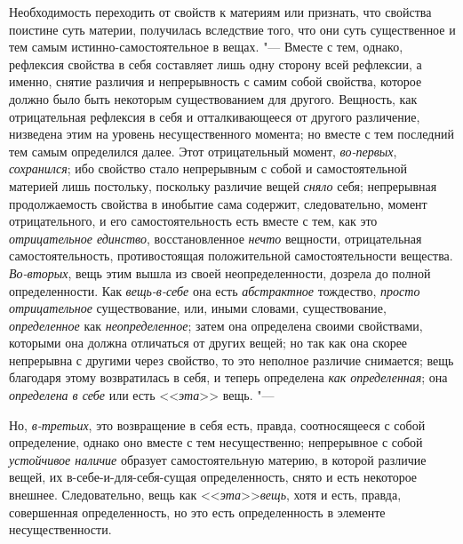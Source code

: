 Необходимость переходить от свойств к материям или признать, что свойства
поистине суть материи, получилась вследствие того, что они суть
существенное и тем самым истинно-самостоятельное в вещах. "--- Вместе с тем,
однако, рефлексия свойства в себя составляет лишь одну сторону всей
рефлексии, а именно, снятие различия и непрерывность с самим собой
свойства, которое должно было быть некоторым существованием для другого.
Вещность, как отрицательная рефлексия в себя и отталкивающееся от другого
различение, низведена этим на уровень несущественного момента; но вместе с
тем последний тем самым определился далее. Этот отрицательный момент,
{\em во-первых}, {\em сохранился};
ибо свойство стало непрерывным с собой и самостоятельной материей лишь
постольку, поскольку различие вещей {\em сняло} себя;
непрерывная продолжаемость свойства в инобытие сама содержит,
следовательно, момент отрицательного, и его самостоятельность есть вместе с
тем, как это {\em отрицательное единство},
восстановленное {\em нечто} вещности, отрицательная
самостоятельность, противостоящая положительной самостоятельности вещества.
{\em Во-вторых}, вещь этим вышла из своей
неопределенности, дозрела до полной определенности. Как
{\em вещь-в-себе} она есть
{\em абстрактное} тождество,
{\em просто отрицательное} существование, или, иными
словами, существование, {\em определенное} как
{\em неопределенное}; затем она определена своими
свойствами, которыми она должна отличаться от других вещей; но так как она
скорее непрерывна с другими через свойство, то это неполное различие
снимается; вещь благодаря этому возвратилась в себя, и теперь определена
{\em как определенная}; она {\em определена в себе} или есть
<<{\em эта}>> вещь. "---

Но, {\em в-третьих}, это возвращение в себя есть,
правда, соотносящееся с собой определение, однако оно вместе с тем
несущественно; непрерывное с собой {\em устойчивое
наличие} образует самостоятельную материю, в которой различие вещей, их
в-себе-и-для-себя-сущая определенность, снято и есть некоторое внешнее.
Следовательно, вещь как <<{\em эта}>>{\em вещь}, хотя и
есть, правда, совершенная определенность, но это есть определенность в
элементе несущественности.

